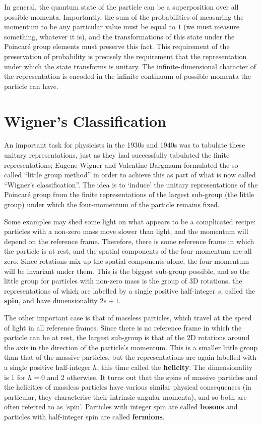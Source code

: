 \documentclass[12pt]{article}
\begin{document}
In general, the quantum state of the particle can be a superposition over all possible momenta. Importantly, the sum of the probabilities of measuring the momentum to be any particular value must be equal to $1$ (we must measure something, whatever it is), and the transformations of this state under the Poincaré group elements must preserve this fact. This requirement of the preservation of probability is precisely the requirement that the representation under which the state transforms is unitary. The infinite-dimensional character of the representation is encoded in the infinite continuum of possible momenta the particle can have.

\section{Wigner's Classification}

An important task for physicists in the 1930s and 1940s was to tabulate these unitary representations, just as they had successfully tabulated the finite representations; Eugene Wigner and Valentine Bargmann formulated the so-called ``little group method'' in order to achieve this as part of what is now called ``Wigner's classification''. The idea is to `induce' the unitary representations of the Poincaré group from the finite representations of the largest sub-group (the little group) under which the four-momentum of the particle remains fixed.
\newline

Some examples may shed some light on what appears to be a complicated recipe: particles with a non-zero mass move slower than light, and the momentum will depend on the reference frame. Therefore, there is some reference frame in which the particle is at rest, and the spatial components of the four-momentum are all zero. Since rotations mix up the spatial components alone, the four-momentum will be invariant under them. This is the biggest sub-group possible, and so the little group for particles with non-zero mass is the group of $3$D rotations, the representations of which are labelled by a single positive half-integer $s$, called the \textbf{spin}, and have dimensionality $2s+1$.
\newline

The other important case is that of massless particles, which travel at the speed of light in all reference frames. Since there is no reference frame in which the particle can be at rest, the largest sub-group is that of the $2$D rotations around the axis in the direction of the particle's momentum. This is a smaller little group than that of the massive particles, but the representations are again labelled with a single positive half-integer $h$, this time called the \textbf{helicity}. The dimensionality is $1$ for $h=0$ and $2$ otherwise. It turns out that the spins of massive particles and the helicities of massless particles have various similar physical consequences (in particular, they characterise their intrinsic angular momenta), and so both are often referred to as `spin'. Particles with integer spin are called \textbf{bosons} and particles with half-integer spin are called \textbf{fermions}.
\end{document}
